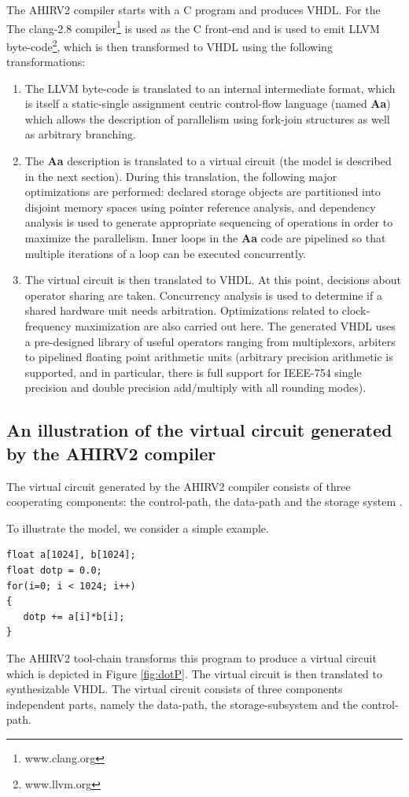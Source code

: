 \documentclass[conference]{IEEEtran}
\begin{document}
The AHIRV2 compiler starts with a C program and produces VHDL.  For the
The clang-2.8 compiler\footnote{www.clang.org} is used as the C front-end
and is used to emit LLVM byte-code\footnote{www.llvm.org}, 
which is then transformed to VHDL using the following transformations:
\begin{enumerate}
\item The LLVM byte-code is translated to an internal intermediate
format, which is itself a static-single assignment centric 
control-flow language (named {\bf Aa}) which allows the description of parallelism
using fork-join structures as well as arbitrary branching.
\item The {\bf Aa} description is translated to a virtual circuit (the model
is described in the next section).  During this translation, the
following major optimizations
are performed:  declared storage objects are partitioned into disjoint memory
spaces using pointer reference analysis, and dependency analysis is used to
generate appropriate sequencing of operations in order to maximize the 
parallelism.  Inner loops in the {\bf Aa} code are pipelined so that
multiple iterations of a loop can be executed concurrently.  
\item The virtual circuit is then translated to VHDL.  At this point,
decisions about operator sharing are taken.  Concurrency analysis is
used to determine if a shared hardware unit needs arbitration. Optimizations
related to clock-frequency maximization are also carried out here.
The generated VHDL uses a pre-designed library of useful operators ranging from
multiplexors, arbiters to pipelined floating point arithmetic units (arbitrary
precision arithmetic is supported, and in particular, there is
full support for IEEE-754 single precision and double precision add/multiply with
all rounding modes).
\end{enumerate}


\subsection{An illustration of the virtual circuit generated by the AHIRV2 compiler}

The virtual circuit generated by the AHIRV2 compiler consists of three
cooperating components: the control-path, the data-path and
the storage system \cite{c:ahir_dsd2010,c:ahir_usenix2012}.

To illustrate the model, we consider a simple example.
\begin{verbatim}
float a[1024], b[1024];
float dotp = 0.0;
for(i=0; i < 1024; i++)
{
   dotp += a[i]*b[i];
}
\end{verbatim}
The AHIRV2 tool-chain transforms this program to 
produce a virtual circuit which is depicted in Figure \ref{fig:dotP}. The
virtual circuit is then translated to synthesizable VHDL.
The virtual circuit consists of three components independent parts, namely
the data-path, the storage-subsystem and the control-path.
\end{document}
